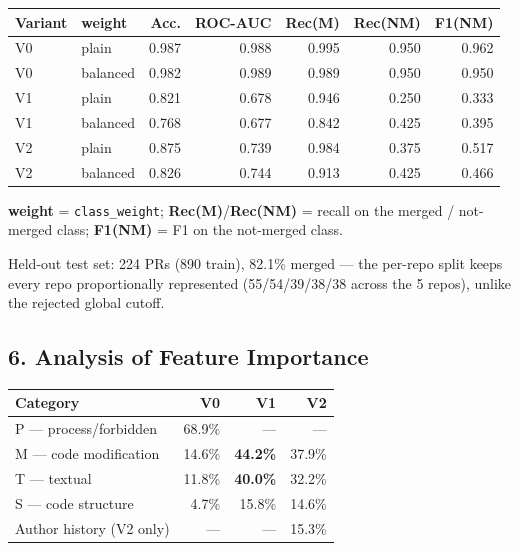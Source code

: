 \documentclass{experimentreport}
\begin{document}
{\begin{center}
\small
\begin{tabular}{|l|l|r|r|r|r|r|}
\hline
\textbf{Variant} & \textbf{weight} & \textbf{Acc.} & \textbf{ROC-AUC} & \textbf{Rec(M)} & \textbf{Rec(NM)} & \textbf{F1(NM)} \\
\hline
V0 & plain    & 0.987 & 0.988 & 0.995 & 0.950 & 0.962 \\
V0 & balanced & 0.982 & 0.989 & 0.989 & 0.950 & 0.950 \\
V1 & plain    & 0.821 & 0.678 & 0.946 & 0.250 & 0.333 \\
V1 & balanced & 0.768 & 0.677 & 0.842 & 0.425 & 0.395 \\
V2 & plain    & 0.875 & 0.739 & 0.984 & 0.375 & 0.517 \\
V2 & balanced & 0.826 & 0.744 & 0.913 & 0.425 & 0.466 \\
\hline
\end{tabular}
\end{center}

\noindent \textbf{weight} = \texttt{class\_weight}; \textbf{Rec(M)}/\textbf{Rec(NM)} = recall on
the merged / not-merged class; \textbf{F1(NM)} = F1 on the not-merged class.

Held-out test set: 224 PRs (890 train), 82.1\% merged --- the per-repo split keeps every repo
proportionally represented (55/54/39/38/38 across the 5 repos), unlike the rejected global cutoff.

\subsection*{6. Analysis of Feature Importance}

\begin{center}
\begin{tabular}{|l|r|r|r|}
\hline
\textbf{Category} & \textbf{V0} & \textbf{V1} & \textbf{V2} \\
\hline
P --- process/forbidden      & 68.9\% & --- & --- \\
M --- code modification      & 14.6\% & \textbf{44.2\%} & 37.9\% \\
T --- textual                & 11.8\% & \textbf{40.0\%} & 32.2\% \\
S --- code structure         & 4.7\%  & 15.8\% & 14.6\% \\
Author history (V2 only)     & ---    & --- & 15.3\% \\
\hline
\end{tabular}
\end{center}

}
\end{document}
